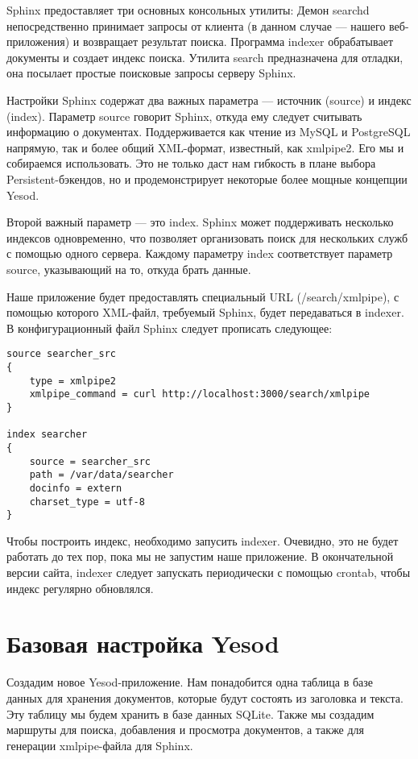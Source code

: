 Sphinx предоставляет три основных консольных утилиты: Демон searchd непосредственно принимает запросы от клиента (в данном случае --- нашего веб-приложения) и возвращает результат поиска. Программа indexer обрабатывает документы и создает индекс поиска. Утилита search предназначена для отладки, она посылает простые поисковые запросы серверу Sphinx.

Настройки Sphinx содержат два важных параметра --- источник (source) и индекс (index). Параметр source говорит Sphinx, откуда ему следует считывать информацию о документах. Поддерживается как чтение из MySQL и PostgreSQL напрямую, так и более общий XML-формат, известный, как xmlpipe2. Его мы и собираемся использовать. Это не только даст нам гибкость в плане выбора Persistent-бэкендов, но и продемонстрирует некоторые более мощные концепции Yesod.

Второй важный параметр --- это index. Sphinx может поддерживать несколько индексов одновременно, что позволяет организовать поиск для нескольких служб с помощью одного сервера. Каждому параметру index соответствует параметр source, указывающий на то, откуда брать данные.

Наше приложение будет предоставлять специальный URL (/search/xmlpipe), с помощью которого XML-файл, требуемый Sphinx, будет передаваться в indexer. В конфигурационный файл Sphinx следует прописать следующее:

\begin{lstlisting}
source searcher_src
{
    type = xmlpipe2
    xmlpipe_command = curl http://localhost:3000/search/xmlpipe
}

index searcher
{
    source = searcher_src
    path = /var/data/searcher
    docinfo = extern
    charset_type = utf-8
}
\end{lstlisting}

Чтобы построить индекс, необходимо запусить indexer. Очевидно, это не будет работать до тех пор, пока мы не запустим наше приложение.  В окончательной версии сайта, indexer следует запускать периодически с помощью crontab, чтобы индекс регулярно обновлялся.

\section{Базовая настройка Yesod} %


Создадим новое Yesod-приложение. Нам понадобится одна таблица в базе данных для хранения документов, которые будут состоять из заголовка и текста. Эту таблицу мы будем хранить в базе данных SQLite. Также мы создадим маршруты для поиска, добавления и просмотра документов, а также для генерации xmlpipe-файла для Sphinx.


